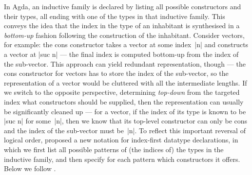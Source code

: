 In Agda, an inductive family is declared by listing all possible constructors and their types, all ending with one of the types in that inductive family.
This conveys the idea that the index in the type of an inhabitant is synthesised in a \emph{bottom-up} fashion following the construction of the inhabitant.
Consider vectors, for example: the cons constructor takes a vector at some index~|n| and constructs a vector at |suc n| --- the final index is computed bottom-up from the index of the sub-vector.
This approach can yield redundant representation, though --- the cons constructor for vectors has to store the index of the sub-vector, so the representation of a vector would be cluttered with all the intermediate lengths.
If we switch to the opposite perspective, determining \emph{top-down} from the targeted index what constructors should be supplied, then the representation can usually be significantly cleaned up --- for a vector, if the index of its type is known to be |suc n| for some~|n|, then we know that its top-level constructor can only be cons and the index of the sub-vector must be~|n|.
To reflect this important reversal of logical order, \citet{Dagand-functional-ornaments} proposed a new notation for index-first datatype declarations, in which we first list all possible patterns of (the indices of) the types in the inductive family, and then specify for each pattern which constructors it offers.
Below we follow .

